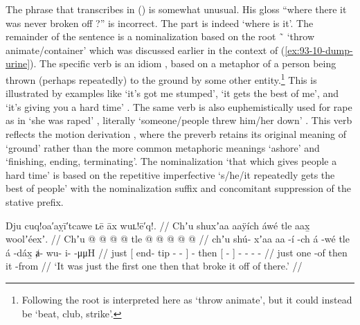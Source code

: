 The phrase that \citeauthor{swanton:1909} transcribes  in (\lastx) is somewhat unusual.
His gloss “where there it was never broken off ?” is incorrect.
The  part is indeed ‘where is it’.
The remainder of the sentence is a nominalization based on the root  \~\  ‘throw animate/container’ which was discussed earlier in the context of (\ref{ex:93-10-dump-urine}).
The specific verb is an idiom , based on a metaphor of a person being thrown (perhaps repeatedly) to the ground by some other entity.\footnote{Following \textcite[803]{leer:1976} the root is interpreted here as ‘throw animate’, but it could instead be ‘beat, club, strike’.} This is illustrated by examples like  ‘it’s got me stumped’,  ‘it gets the best of me’, and  ‘it’s giving you a hard time’ \parencite[f02/59]{leer:1973}.
The same verb is also euphemistically used for rape as in  ‘she was raped’ \parencite[f02/59]{leer:1973}, literally ‘someone/people threw him/her down’ \parencite[803]{leer:1976}.
This verb reflects the motion derivation , where the preverb  retains its original meaning of ‘ground’ rather than the more common metaphoric meanings ‘ashore’ and ‘finishing, ending, terminating’.
The nominalization  ‘that which gives people a hard time’ is based on the  repetitive imperfective  ‘s/he/it repeatedly gets the best of people’ with the nominalization suffix  and concomitant suppression of the stative  prefix.

\ex\label{ex:93-43-first-one-broke-off}%
%
\begingl
	\glpreamble	Dju cuq!oa′aỵī′tcawe ʟē āx wuʟ!ē′q!. //
	\glpreamble	Chʼu shuxʼaa aaÿích áwé tle aax̱ woolʼéexʼ. //
	\gla	Chʼu {}  @ {}  @ {} @ {} {}
		 @ {}
		tle {}  @ {} {}
		 @ {} @ {} @ {} @ {} //
	\glb	chʼu {} shú- xʼaa aa -í -ch {}
		á -wé
		tle {} á -dáx̱ {}
		ⱥ- wu- i-  -μμH //
	\glc	just {}[ end- tip  - - {}]
		 -
		then
		{}[  - {}]
		- - -  - //
	\gld	just {}  {} one -of {} {}
		 {}
		then {} it -from {}
		 {} {} {} {} //
	\glft	‘It was just the first one then that broke it off of there.’
		//
\endgl
\xe


